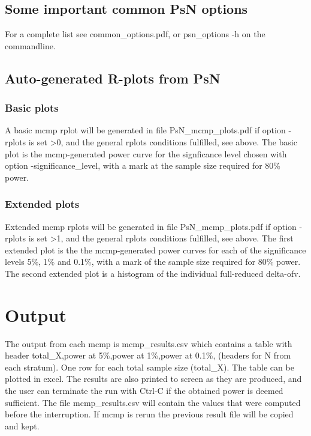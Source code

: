\subsection{Some important common PsN options}
For a complete list see common\_options.pdf, 
or psn\_options -h on the commandline.


\subsection{Auto-generated R-plots from PsN}
\newcommand{\rplotsconditions}{The default mcmp template 
requires the R library ggplot2.
If the package is not installed then no pdf will be generated,
see the .Rout file in the main run directory for error messages.}


\subsubsection*{Basic plots}
A basic mcmp rplot will be generated in file PsN\_mcmp\_plots.pdf if option -rplots is set >0,
and the general rplots conditions fulfilled, see above.
The basic plot is the mcmp-generated power curve for
the signficance level chosen with option -significance\_level, with a mark at the sample size 
required for 80\% power.
\subsubsection*{Extended plots}
Extended mcmp rplots will be generated in file PsN\_mcmp\_plots.pdf if option -rplots is set >1,
and the general rplots conditions fulfilled, see above.
The first extended plot is the the mcmp-generated power curves for
each of the significance levels 5\%, 1\% and 0.1\%, with a mark of the sample size 
required for 80\% power.
The second extended plot is a histogram of the individual full-reduced delta-ofv. 

\section{Output}
The output from each mcmp is mcmp\_results.csv which contains a table with header total\_X,power at 5\%,power at 1\%,power at 0.1\%, (headers for N from each stratum). One row for each total sample size (total\_X). The table can be plotted in excel. The results are also printed to screen as they are produced, and the user can terminate the run with Ctrl-C if the obtained power is deemed sufficient. The file mcmp\_results.csv will contain the values that were computed before the interruption. If mcmp is rerun the previous result file will be copied and kept.

